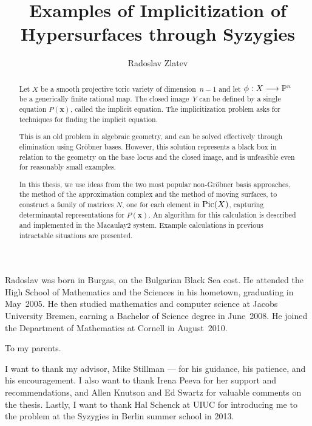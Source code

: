 \documentclass[phd,tocprelim]{cornell}
\title {Examples of Implicitization of Hypersurfaces through Syzygies}
\author {Radoslav Zlatev}
\numberwithin{first}{chapter}
\begin{document}
\maketitle
\makecopyright

\begin{abstract}
Let $X$ be a smooth projective toric variety of dimension~$n-1$
and let $\phi:X\longrightarrow\mathbb{P}^n$ be a generically finite rational map.
The closed image~$Y$ can be defined by a single equation $P(\mathbf x)$,
called the implicit equation.
The implicitization problem asks for techniques for finding the implicit equation.

This is an old problem in algebraic geometry, and can be solved effectively
through elimination using Gr\"obner bases.
However, this solution represents
a black box in relation to the geometry on the base locus and the closed image,
and is unfeasible even for reasonably small examples.

In this thesis, we use ideas from the two most popular non-Gr\"obner basis approaches,
the method of the approximation complex and the method of moving surfaces,
to construct a family of matrices $N$, one for each element in $\operatorname{Pic}(X)$,
capturing determinantal representations for $P(\mathbf x)$.
An algorithm for this calculation is described and implemented in the Macaulay2 system.
Example calculations in previous intractable situations are presented.
\end{abstract}

\begin{biosketch}
Radoslav was born in Burgas, on the Bulgarian Black Sea cost.
He attended the High School of Mathematics and the Sciences in his hometown, graduating in May~2005.
He then studied mathematics and computer science at Jacobs University Bremen,
earning a Bachelor of Science degree in June~2008.
He joined the Department of Mathematics at Cornell in August~2010.
\end{biosketch}

\begin{dedication}
To my parents.
\end{dedication}

\begin{acknowledgements}
I want to thank my advisor, Mike Stillman ---
for his guidance, his patience, and his encouragement.
I also want to thank
Irena Peeva for her support and recommendations, and
Allen Knutson and Ed Swartz for valuable comments on the thesis.
Lastly, I want to thank
Hal Schenck at UIUC  for introducing me to the problem
at the Syzygies in Berlin summer school in 2013.
\end{acknowledgements}
\end{document}
